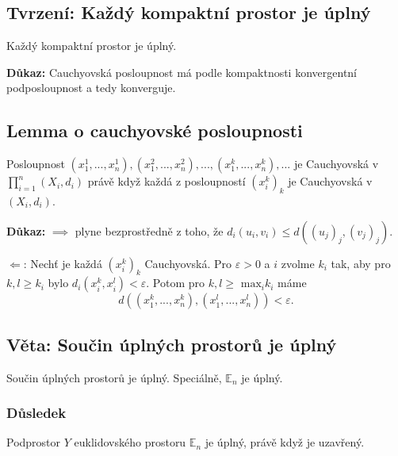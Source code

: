 \documentclass[../main.tex]{subfiles}
\begin{document}
\subsection{Tvrzení: Každý kompaktní prostor je úplný}
\hspace{1.2mm}
\noindent
Každý kompaktní prostor je úplný.

\vspace{5mm}
\noindent
\textbf{Důkaz:} Cauchyovská posloupnost má podle kompaktnosti konvergentní podposloupnost a tedy konverguje.

\subsection{Lemma o cauchyovské posloupnosti}
\hspace{1.2mm}
\noindent
Posloupnost $(x_{1}^{1}, ... , x_{n}^{1}), (x_{1}^{2},...,x_{n}^{2}), ...,(x_{1}^{k},...,x_{n}^{k}),...$
je Cauchyovská v $\prod_{i=1}^{n}(X_i, d_i)$ právě když každá z posloupností $(x_{i}^{k})_k$ je
Cauchyovská v $(X_i, d_i)$.

\vspace{5mm}
\noindent
\textbf{Důkaz:} $\implies$ plyne bezprostředně z toho, že $d_i(u_i,v_i) \leq d((u_j)_j,(v_j)_j).$

$\Leftarrow$: Nechť je každá $(x_i^k)_k$ Cauchyovská. Pro $\varepsilon > 0$ a $i$ zvolme $k_i$ tak,
aby pro $k,l \geq k_i$ bylo $d_i(x_i^k, x_i^l) < \varepsilon.$ Potom pro $k,l \geq$ $\text{max}_i k_i$ máme 
\[d((x_1^k,...,x_n^k),(x_1^l,...,x_n^l)) < \varepsilon.\]

\subsection{Věta: Součin úplných prostorů je úplný }
\hspace{1.2mm}
\noindent
Součin úplných prostorů je úplný. Speciálně, $\mathbb{E}_n$ je úplný.

\subsubsection{Důsledek}
\hspace{1.2mm}
\noindent
Podprostor $Y$ euklidovského prostoru $\mathbb{E}_n$ je úplný, právě když je uzavřený.
\end{document}
